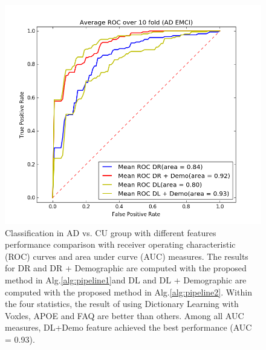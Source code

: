 \begin{figure}[h]
	\centering
	\includegraphics[width=\linewidth]{figures/AD_EMCI}
	\caption[ROC for AD vs. EMCI]{Classification in AD vs. CU group with different features performance comparison with receiver operating characteristic (ROC) curves and area under curve (AUC) measures. The results for DR and DR + Demographic are computed with the proposed method in Alg.\ref{alg:pipeline1}and DL and DL + Demographic are computed with the proposed method in Alg.\ref{alg:pipeline2}. Within the four statistics, the result of using Dictionary Learning with Voxles, APOE and FAQ are better than others.  Among all AUC measures, DL+Demo feature achieved the best performance (AUC = 0.93).}
	\label{fig:ademci}
\end{figure}
